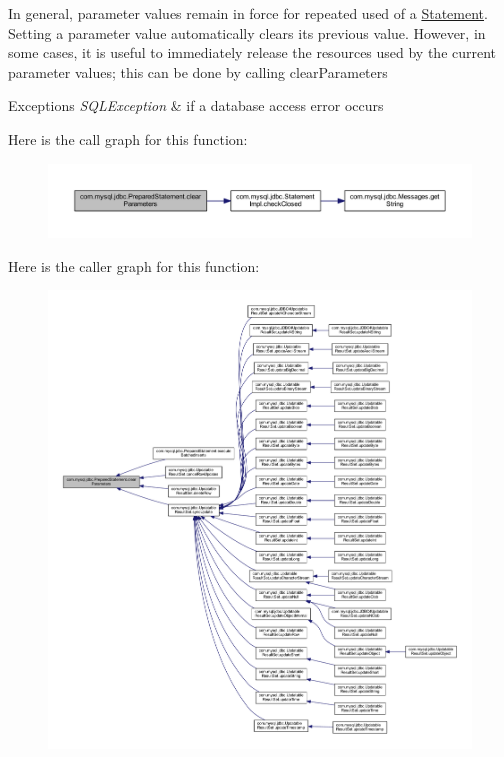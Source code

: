 In general, parameter values remain in force for repeated used of a \mbox{\hyperlink{interfacecom_1_1mysql_1_1jdbc_1_1_statement}{Statement}}. Setting a parameter value automatically clears its previous value. However, in some cases, it is useful to immediately release the resources used by the current parameter values; this can be done by calling clear\+Parameters


\begin{DoxyExceptions}{Exceptions}
{\em S\+Q\+L\+Exception} & if a database access error occurs \\
\hline
\end{DoxyExceptions}
Here is the call graph for this function\+:
\nopagebreak
\begin{figure}[H]
\begin{center}
\leavevmode
\includegraphics[width=350pt]{classcom_1_1mysql_1_1jdbc_1_1_prepared_statement_ac1bd628fd165487d93822d0198ead08a_cgraph}
\end{center}
\end{figure}
Here is the caller graph for this function\+:
\nopagebreak
\begin{figure}[H]
\begin{center}
\leavevmode
\includegraphics[width=350pt]{classcom_1_1mysql_1_1jdbc_1_1_prepared_statement_ac1bd628fd165487d93822d0198ead08a_icgraph}
\end{center}
\end{figure}
